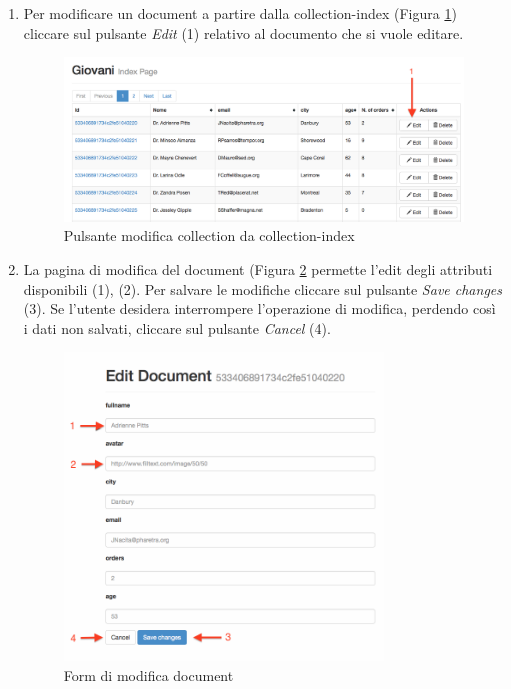 		\begin{enumerate}

			\item Per modificare un document a partire dalla collection-index (Figura \ref{fig:modificadocumentdacollectionindex}) cliccare sul pulsante \emph{Edit} (1) relativo al documento che si vuole editare. 

				\begin{figure}[H]
					\centering \includegraphics[width=1\textwidth]{img/modificadocumentdacollectionindex.png}
				\caption{\label{fig:modificadocumentdacollectionindex} Pulsante modifica collection da collection-index}
				\end{figure}

			\item \label{modificaDocumentForm} La pagina di modifica del document (Figura \ref{fig:modificaDocumentForm} permette l'edit degli attributi disponibili (1), (2). Per salvare le modifiche cliccare sul pulsante \emph{Save changes} (3). Se l'utente desidera interrompere l'operazione di modifica, perdendo così i dati non salvati, cliccare sul pulsante \emph{Cancel} (4). 

				\begin{figure}[H]
					\centering \includegraphics[width=0.8\textwidth]{img/modificaDocumentForm.png}
					\caption{\label{fig:modificaDocumentForm} Form di modifica document}
				\end{figure}

		\end{enumerate}

